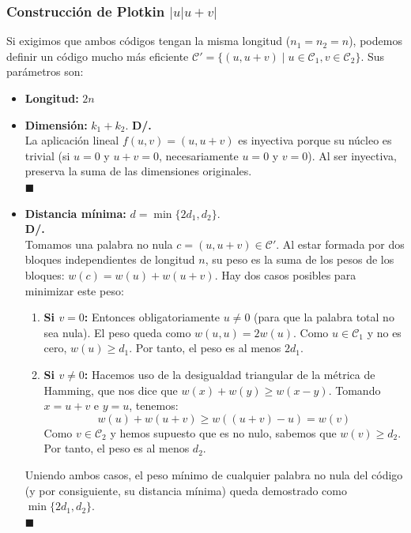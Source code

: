 \documentclass{article}
\begin{document}
\subsubsection{Construcción de Plotkin $|u|u+v|$}
Si exigimos que ambos códigos tengan la misma longitud ($n_1 = n_2 = n$), podemos definir un código mucho más eficiente $\mathcal{C}' = \{(u, u+v) \mid u \in \mathcal{C}_1, v \in \mathcal{C}_2\}$. Sus parámetros son:
\begin{itemize}
    \item \textbf{Longitud:} $2n$
    \item \textbf{Dimensión:} $k_1 + k_2$. 
       \noindent\textbf{D/. }\\
       La aplicación lineal $f(u,v) = (u, u+v)$ es inyectiva porque su núcleo es trivial (si $u=0$ y $u+v=0$, necesariamente $u=0$ y $v=0$). Al ser inyectiva, preserva la suma de las dimensiones originales.\\
       $\blacksquare$
    \item \textbf{Distancia mínima:} $d = \min\{2d_1, d_2\}$.\\
       \noindent\textbf{D/. }\\
        Tomamos una palabra no nula $c = (u, u+v) \in \mathcal{C}'$. Al estar formada por dos bloques independientes de longitud $n$, su peso es la suma de los pesos de los bloques: $w(c) = w(u) + w(u+v)$. Hay dos casos posibles para minimizar este peso:
        \begin{enumerate}
            \item \textbf{Si $v = 0$:} Entonces obligatoriamente $u \neq 0$ (para que la palabra total no sea nula). El peso queda como $w(u, u) = 2w(u)$. Como $u \in \mathcal{C}_1$ y no es cero, $w(u) \ge d_1$. Por tanto, el peso es al menos $2d_1$.
            \item \textbf{Si $v \neq 0$:} Hacemos uso de la desigualdad triangular de la métrica de Hamming, que nos dice que $w(x) + w(y) \ge w(x - y)$. Tomando $x = u+v$ e $y = u$, tenemos:
            \[ w(u) + w(u+v) \ge w((u+v) - u) = w(v) \]
            Como $v \in \mathcal{C}_2$ y hemos supuesto que es no nulo, sabemos que $w(v) \ge d_2$. Por tanto, el peso es al menos $d_2$.
        \end{enumerate}
        Uniendo ambos casos, el peso mínimo de cualquier palabra no nula del código (y por consiguiente, su distancia mínima) queda demostrado como $\min\{2d_1, d_2\}$. \\
       $\blacksquare$
\end{itemize}
\end{document}
